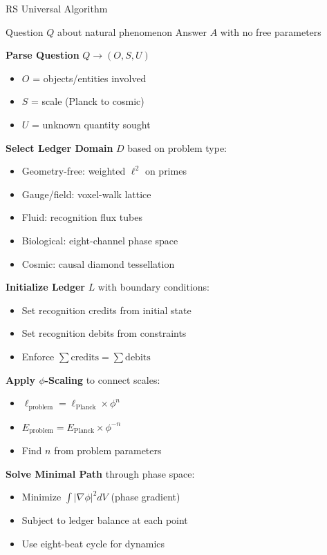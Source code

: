 \documentclass[12pt,a4paper]{article}
\begin{document}
\begin{algorithm}
\caption{RS Universal Algorithm}
\begin{algorithmic}[1]
\REQUIRE Question $Q$ about natural phenomenon
\ENSURE Answer $A$ with no free parameters

\STATE \textbf{Parse Question} $Q \rightarrow (O, S, U)$
    \begin{itemize}
    \item $O$ = objects/entities involved
    \item $S$ = scale (Planck to cosmic)
    \item $U$ = unknown quantity sought
    \end{itemize}

\STATE \textbf{Select Ledger Domain} $D$ based on problem type:
    \begin{itemize}
    \item Geometry-free: weighted $\ell^2$ on primes
    \item Gauge/field: voxel-walk lattice
    \item Fluid: recognition flux tubes
    \item Biological: eight-channel phase space
    \item Cosmic: causal diamond tessellation
    \end{itemize}

\STATE \textbf{Initialize Ledger} $L$ with boundary conditions:
    \begin{itemize}
    \item Set recognition credits from initial state
    \item Set recognition debits from constraints
    \item Enforce $\sum \text{credits} = \sum \text{debits}$
    \end{itemize}

\STATE \textbf{Apply $\phi$-Scaling} to connect scales:
    \begin{itemize}
    \item $\ell_{\text{problem}} = \ell_{\text{Planck}} \times \phi^n$
    \item $E_{\text{problem}} = E_{\text{Planck}} \times \phi^{-n}$
    \item Find $n$ from problem parameters
    \end{itemize}

\STATE \textbf{Solve Minimal Path} through phase space:
    \begin{itemize}
    \item Minimize $\int |\nabla\phi|^2 dV$ (phase gradient)
    \item Subject to ledger balance at each point
    \item Use eight-beat cycle for dynamics
    \end{itemize}


\end{algorithmic}
\end{algorithm}
\end{document}
